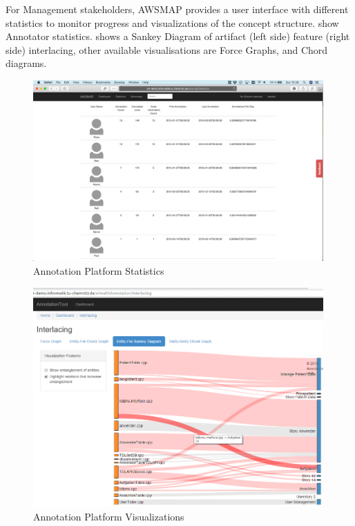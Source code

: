 For Management stakeholders, AWSMAP provides a user interface with different statistics to monitor progress and visualizations of the concept structure.
 show Annotator statistics.
 shows a Sankey Diagram of artifact (left side) feature (right side) interlacing, other available visualisations are Force Graphs, and Chord diagrams.

\begin{figure}
\hypertarget{fig:awsmap.statistics}{%
\centering
\includegraphics[width=0.99\textwidth]{../figures/screenshots/ap-statistics-result.png}
\caption{Annotation Platform Statistics}\label{fig:awsmap.statistics}
}
\end{figure}

\begin{figure}
\hypertarget{fig:awsmap.sankey}{%
\centering
\includegraphics[width=0.99\textwidth]{../figures/screenshots/sankey.png}
\caption{Annotation Platform Visualizations}\label{fig:awsmap.sankey}
}
\end{figure}

